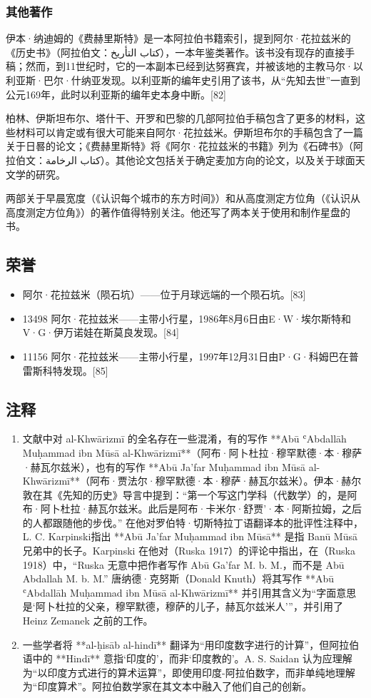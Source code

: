 \subsubsection{其他著作}  
伊本·纳迪姆的《费赫里斯特》是一本阿拉伯书籍索引，提到阿尔·花拉兹米的《历史书》（阿拉伯文：كتاب التأريخ），一本年鉴类著作。该书没有现存的直接手稿；然而，到11世纪时，它的一本副本已经到达努赛宾，并被该地的主教马尔·以利亚斯·巴尔·什纳亚发现。以利亚斯的编年史引用了该书，从“先知去世”一直到公元169年，此时以利亚斯的编年史本身中断。[82]

柏林、伊斯坦布尔、塔什干、开罗和巴黎的几部阿拉伯手稿包含了更多的材料，这些材料可以肯定或有很大可能来自阿尔·花拉兹米。伊斯坦布尔的手稿包含了一篇关于日晷的论文；《费赫里斯特》将《阿尔·花拉兹米的书籍》列为《石碑书》（阿拉伯文：كتاب الرخامة）。其他论文包括关于确定麦加方向的论文，以及关于球面天文学的研究。

两部关于早晨宽度（《认识每个城市的东方时间》）和从高度测定方位角（《认识从高度测定方位角》）的著作值得特别关注。他还写了两本关于使用和制作星盘的书。
\subsection{荣誉}
\begin{itemize}
\item 阿尔·花拉兹米（陨石坑）——位于月球远端的一个陨石坑。[83]  
\item 13498 阿尔·花拉兹米——主带小行星，1986年8月6日由E·W·埃尔斯特和V·G·伊万诺娃在斯莫良发现。[84]  
\item 11156 阿尔·花拉兹米——主带小行星，1997年12月31日由P·G·科姆巴在普雷斯科特发现。[85]
\end{itemize}
\subsection{注释}  


\begin{enumerate}
\item 文献中对 al-Khwārizmī 的全名存在一些混淆，有的写作 **Abū ʿAbdallāh Muḥammad ibn Mūsā al-Khwārizmī**（阿布·阿卜杜拉·穆罕默德·本·穆萨·赫瓦尔兹米），也有的写作 **Abū Ja'far Muḥammad ibn Mūsā al-Khwārizmī**（阿布·贾法尔·穆罕默德·本·穆萨·赫瓦尔兹米）。伊本·赫尔敦在其《先知的历史》导言中提到：“第一个写这门学科（代数学）的，是阿布·阿卜杜拉·赫瓦尔兹米。此后是阿布·卡米尔·舒贾'·本·阿斯拉姆，之后的人都跟随他的步伐。”  
在他对罗伯特·切斯特拉丁语翻译本的批评性注释中，L. C. Karpinski指出 **Abū Ja'far Muḥammad ibn Mūsā** 是指 Banū Mūsā 兄弟中的长子。Karpinski 在他对（Ruska 1917）的评论中指出，在（Ruska 1918）中，“Ruska 无意中把作者写作 Abū Ga'far M. b. M.，而不是 Abū Abdallah M. b. M.”  
唐纳德·克努斯（Donald Knuth）将其写作 **Abū ʿAbdallāh Muḥammad ibn Mūsā al-Khwārizmī** 并引用其含义为“字面意思是‘阿卜杜拉的父亲，穆罕默德，穆萨的儿子，赫瓦尔兹米人’”，并引用了 Heinz Zemanek 之前的工作。  
\item 一些学者将 **al-ḥisāb al-hindī** 翻译为“用印度数字进行的计算”，但阿拉伯语中的 **Hindī** 意指‘印度的’，而非‘印度教的’。A. S. Saidan 认为应理解为“以印度方式进行的算术运算”，即使用印度-阿拉伯数字，而非单纯地理解为“印度算术”。阿拉伯数学家在其文本中融入了他们自己的创新。
\end{enumerate}